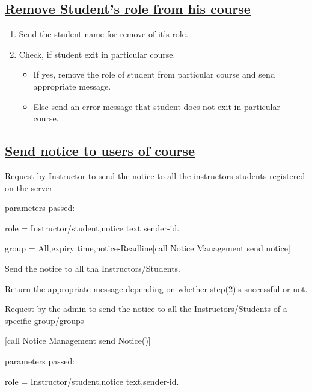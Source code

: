 \documentclass{article}
\begin{document}
\subsection*{\underline{Remove Student's role from his course}}
\begin{enumerate}
	\item Send the student name for remove of it's role.
   
	\item Check, if student exit in particular course.
    \begin{itemize}
	\item If yes, remove the role of student from particular course and send appropriate message.

	\item Else send an error message that student does not exit in particular course.
    \end{itemize}

\begin{center}

\end{center}
\end{enumerate}

	\subsection*{\underline{Send notice to users of course}}
 Request by Instructor to send the notice to all the instructors students registered on the server

	      parameters passed: 

			 role  = Instructor/student,notice text sender-id.

		         group = All,expiry time,notice-Readline[call Notice Management send notice]

	 Send the notice to all tha Instructors/Students.
\begin{center}

\end{center}

	 Return the appropriate message depending on whether step(2)is successful or not.

 Request by the admin to send the notice to all the Instructors/Students of a specific group/groups 

		[call Notice Management send Notice()]

	      parameters passed:

		         role  = Instructor/student,notice text,sender-id.
\end{document}
